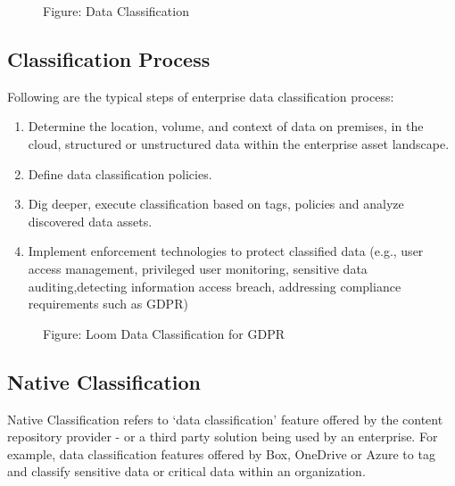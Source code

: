 \documentclass[letterpaper,10pt,english]{sphinxmanual}
\begin{document}
\begin{figure}[htbp]
\centering
\capstart

\noindent{}
\caption{Figure: Data Classification}\label{\detokenize{mcdmp_concepts:id19}}\end{figure}


\subsection{Classification Process}
\label{\detokenize{mcdmp_concepts:classification-process}}\label{\detokenize{mcdmp_concepts:term-cls-process}}
Following are the typical steps of enterprise data classification process:
\begin{enumerate}
\item {} 
 Determine the location, volume, and context of data on premises, in the cloud, structured or unstructured data within the enterprise asset landscape.

\item {} 
 Define data classification policies.

\item {} 
 Dig deeper, execute classification based on tags, policies and analyze discovered data assets.

\item {} 
 Implement enforcement technologies to protect classified data (e.g., user access management, privileged user monitoring, sensitive data auditing,detecting information access breach, addressing compliance requirements such as GDPR)

\end{enumerate}

\begin{figure}[htbp]
\centering
\capstart

\noindent{}
\caption{Figure: Loom Data Classification for GDPR}\label{\detokenize{mcdmp_concepts:id20}}\end{figure}


\subsection{Native Classification}
\label{\detokenize{mcdmp_concepts:term-native-cls}}\label{\detokenize{mcdmp_concepts:native-classification}}
Native Classification refers to ‘data classification’ feature offered by the content repository provider - or a third party solution being used by an enterprise.  For example, data classification features offered by Box, OneDrive or Azure to tag and classify sensitive data or critical data within an organization.
\end{document}
